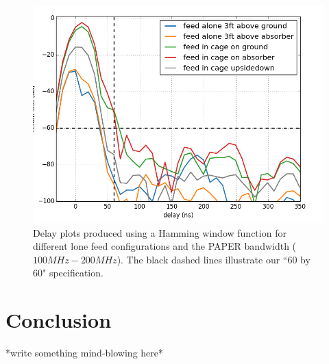 \documentclass[12pt,preprint]{aastex}
\begin{document}
\begin{figure}
\centering
\includegraphics[totalheight=0.4\textheight]{plots/delay_feed.png}
\caption{Delay plots produced using a Hamming window function for different lone feed configurations and the PAPER bandwidth ($100MHz-200MHz$). The black dashed lines illustrate our ``60 by 60" specification.}
\label{fig:outofthedish}
\end{figure}


\section{Conclusion}

*write something mind-blowing here*
\end{document}
